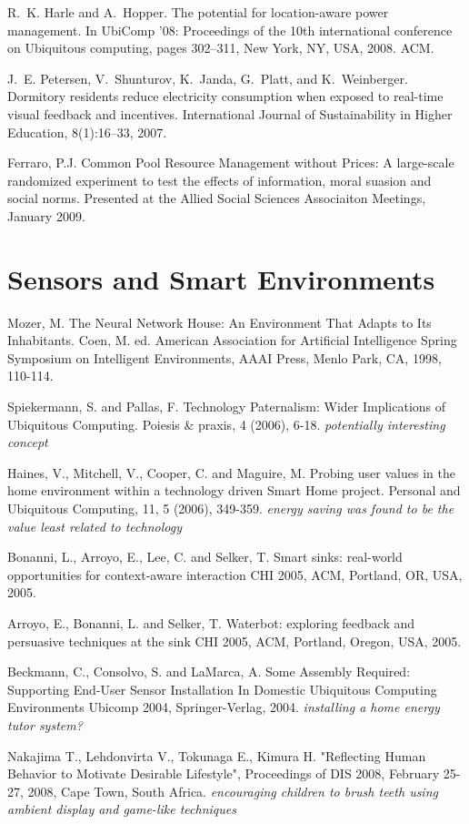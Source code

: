 R. K. Harle and A. Hopper. The potential for location-aware power management. In UbiComp ’08: Proceedings of the 10th international conference on Ubiquitous computing, pages 302–311, New York, NY, USA, 2008. ACM.

J. E. Petersen, V. Shunturov, K. Janda, G. Platt, and K. Weinberger. Dormitory residents reduce electricity consumption when exposed to real-time visual feedback and incentives. International Journal of Sustainability in Higher Education, 8(1):16–33, 2007.

Ferraro, P.J. Common Pool Resource Management without Prices:  A large-scale randomized experiment to test the effects of information, moral suasion and social norms. Presented at the Allied Social Sciences Associaiton Meetings, January 2009.



\section{Sensors and Smart Environments}


Mozer, M. The Neural Network House: An Environment That Adapts to Its Inhabitants. Coen, M. ed. American Association for Artificial Intelligence Spring Symposium on Intelligent Environments, AAAI Press, Menlo Park, CA, 1998, 110-114.

Spiekermann, S. and Pallas, F. Technology Paternalism: Wider Implications of Ubiquitous Computing. Poiesis \& praxis, 4 (2006), 6-18. \emph{potentially interesting concept}

Haines, V., Mitchell, V., Cooper, C. and Maguire, M. Probing user values in the home environment within a technology driven Smart Home project. Personal and Ubiquitous Computing, 11, 5 (2006), 349-359. \emph{energy saving was found to be the value least related to technology}

Bonanni, L., Arroyo, E., Lee, C. and Selker, T. Smart sinks: real-world opportunities for context-aware interaction CHI 2005, ACM, Portland, OR, USA, 2005.

Arroyo, E., Bonanni, L. and Selker, T. Waterbot: exploring feedback and persuasive techniques at the sink CHI 2005, ACM, Portland, Oregon, USA, 2005.

Beckmann, C., Consolvo, S. and LaMarca, A. Some Assembly Required: Supporting End-User Sensor Installation In Domestic Ubiquitous Computing Environments Ubicomp 2004, Springer-Verlag, 2004. \emph{installing a home energy tutor system?}

Nakajima T., Lehdonvirta V., Tokunaga E., Kimura H. "Reflecting Human Behavior to Motivate Desirable Lifestyle", Proceedings of DIS 2008, February 25-27, 2008, Cape Town, South Africa. \emph{encouraging children to brush teeth using ambient display and game-like techniques}

